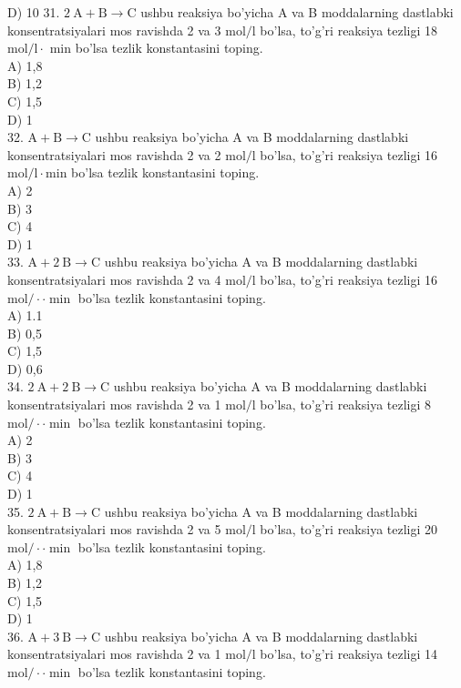 D) 10
31. $2 \mathrm{~A}+\mathrm{B} \rightarrow \mathrm{C}$ ushbu reaksiya bo'yicha A va B moddalarning dastlabki konsentratsiyalari mos ravishda 2 va 3 $\mathrm{mol} / \mathrm{l}$ bo'lsa, to'g'ri reaksiya tezligi 18 $\mathrm{mol} / \mathrm{l} \cdot$ min bo'lsa tezlik konstantasini toping.\\
A) 1,8\\
B) 1,2\\
C) 1,5\\
D) 1\\
32. $\mathrm{A}+\mathrm{B} \rightarrow \mathrm{C}$ ushbu reaksiya bo'yicha A va B moddalarning dastlabki konsentratsiyalari mos ravishda 2 va 2 $\mathrm{mol} / \mathrm{l}$ bo'lsa, to'g'ri reaksiya tezligi 16 $\mathrm{mol} / \mathrm{l} \cdot \mathrm{min}$ bo'lsa tezlik konstantasini toping.\\
A) 2\\
B) 3\\
C) 4\\
D) 1\\
33. $\mathrm{A}+2 \mathrm{~B} \rightarrow \mathrm{C}$ ushbu reaksiya bo'yicha A va B moddalarning dastlabki konsentratsiyalari mos ravishda 2 va 4 $\mathrm{mol} / \mathrm{l}$ bo'lsa, to'g'ri reaksiya tezligi 16 $\mathrm{mol} / \cdot \cdot \min$ bo'lsa tezlik konstantasini toping.\\
A) 1.1\\
B) 0,5\\
C) 1,5\\
D) 0,6\\
34. $2 \mathrm{~A}+2 \mathrm{~B} \rightarrow \mathrm{C}$ ushbu reaksiya bo'yicha A va B moddalarning dastlabki konsentratsiyalari mos ravishda 2 va 1 $\mathrm{mol} / \mathrm{l}$ bo'lsa, to'g'ri reaksiya tezligi 8 $\mathrm{mol} / \cdot \cdot \min$ bo'lsa tezlik konstantasini toping.\\
A) 2\\
B) 3\\
C) 4\\
D) 1\\
35. $2 \mathrm{~A}+\mathrm{B} \rightarrow \mathrm{C}$ ushbu reaksiya bo'yicha A va B moddalarning dastlabki konsentratsiyalari mos ravishda 2 va 5 $\mathrm{mol} / \mathrm{l}$ bo'lsa, to'g'ri reaksiya tezligi 20 $\mathrm{mol} / \cdot \cdot \min$ bo'lsa tezlik konstantasini toping.\\
A) 1,8\\
B) 1,2\\
C) 1,5\\
D) 1\\
36. $\mathrm{A}+3 \mathrm{~B} \rightarrow \mathrm{C}$ ushbu reaksiya bo'yicha A va B moddalarning dastlabki konsentratsiyalari mos ravishda 2 va 1 $\mathrm{mol} / \mathrm{l}$ bo'lsa, to'g'ri reaksiya tezligi 14 $\mathrm{mol} / \cdot \cdot \min$ bo'lsa tezlik konstantasini toping.\\
